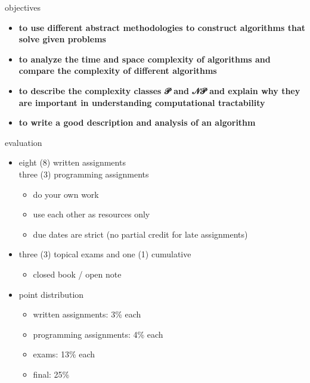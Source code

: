 \documentclass[10pt,t,usenames,dvipsnames]{beamer}
\begin{document}
  \begin{frame}{objectives}
    \begin{itemize}
      \setlength\itemsep{10pt}
      \item \textbf<2>{to use different abstract methodologies to construct
        algorithms that solve given problems}
      \item \textbf<3>{to analyze the time and space complexity of algorithms
        and compare the complexity of different algorithms}
      \item \textbf<4>{to describe the complexity classes 𝒫 and 𝒩𝒫 and explain
        why they are important in understanding computational tractability}
      \item \textbf<5>{to write a good description and analysis of an algorithm}
    \end{itemize}
  \end{frame}

  \begin{frame}{evaluation}
    \begin{itemize}
      \setlength\itemsep{10pt}
      \item eight (8) written assignments\\three (3) programming assignments
        \begin{itemize}%
          \item do your own work
          \item use each other as resources only
          \item due dates are strict (no partial credit for late assignments)
        \end{itemize}
      \item three (3) topical exams and one (1) cumulative
        \begin{itemize}%
          \item closed book / open note
        \end{itemize}
      \item point distribution
        \begin{itemize}
          \item written assignments: 3\% each
          \item programming assignments: 4\% each
          \item exams: 13\% each
          \item final: 25\%
        \end{itemize}
    \end{itemize}

  \end{frame}
\end{document}
